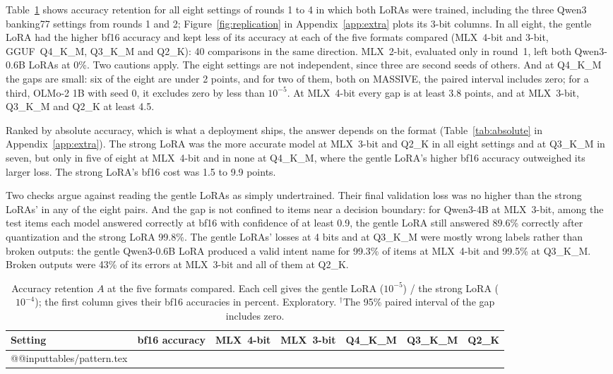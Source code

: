 \documentclass[10pt]{article}
\makeatletter
\newcommand*{\tablerows}[1]{\csname @@input\endcsname #1 }
\makeatother
\begin{document}
Table~\ref{tab:pattern} shows accuracy retention for all eight settings of rounds 1 to 4 in which both LoRAs were trained, including the three Qwen3 banking77 settings from rounds 1 and 2; Figure~\ref{fig:replication} in Appendix~\ref{app:extra} plots its 3-bit columns. In all eight, the gentle LoRA had the higher bf16 accuracy and kept less of its accuracy at each of the five formats compared (MLX~4-bit and 3-bit, GGUF~Q4\_K\_M, Q3\_K\_M and Q2\_K): 40 comparisons in the same direction. MLX~2-bit, evaluated only in round~1, left both Qwen3-0.6B LoRAs at 0\%. Two cautions apply. The eight settings are not independent, since three are second seeds of others. And at Q4\_K\_M the gaps are small: six of the eight are under 2 points, and for two of them, both on MASSIVE, the paired interval includes zero; for a third, OLMo-2 1B with seed 0, it excludes zero by less than $10^{-5}$. At MLX~4-bit every gap is at least 3.8 points, and at MLX~3-bit, Q3\_K\_M and Q2\_K at least 4.5.

Ranked by absolute accuracy, which is what a deployment ships, the answer depends on the format (Table~\ref{tab:absolute} in Appendix~\ref{app:extra}). The strong LoRA was the more accurate model at MLX~3-bit and Q2\_K in all eight settings and at Q3\_K\_M in seven, but only in five of eight at MLX~4-bit and in none at Q4\_K\_M, where the gentle LoRA's higher bf16 accuracy outweighed its larger loss. The strong LoRA's bf16 cost was 1.5 to 9.9 points.

Two checks argue against reading the gentle LoRAs as simply undertrained. Their final validation loss was no higher than the strong LoRAs' in any of the eight pairs. And the gap is not confined to items near a decision boundary: for Qwen3-4B at MLX~3-bit, among the test items each model answered correctly at bf16 with confidence of at least 0.9, the gentle LoRA still answered 89.6\% correctly after quantization and the strong LoRA 99.8\%. The gentle LoRAs' losses at 4 bits and at Q3\_K\_M were mostly wrong labels rather than broken outputs: the gentle Qwen3-0.6B LoRA produced a valid intent name for 99.3\% of items at MLX~4-bit and 99.5\% at Q3\_K\_M. Broken outputs were 43\% of its errors at MLX~3-bit and all of them at Q2\_K.

\begin{table}[htbp]
\centering\footnotesize
\caption{Accuracy retention $A$ at the five formats compared. Each cell gives the gentle LoRA ($10^{-5}$) / the strong LoRA ($10^{-4}$); the first column gives their bf16 accuracies in percent. Exploratory. $^\dagger$The 95\% paired interval of the gap includes zero.}
\label{tab:pattern}
\begin{tabular}{lcccccc}
\toprule
Setting & bf16 accuracy & MLX~4-bit & MLX~3-bit & Q4\_K\_M & Q3\_K\_M & Q2\_K \\
\midrule
\tablerows{tables/pattern.tex}
\bottomrule
\end{tabular}
\end{table}
\end{document}
